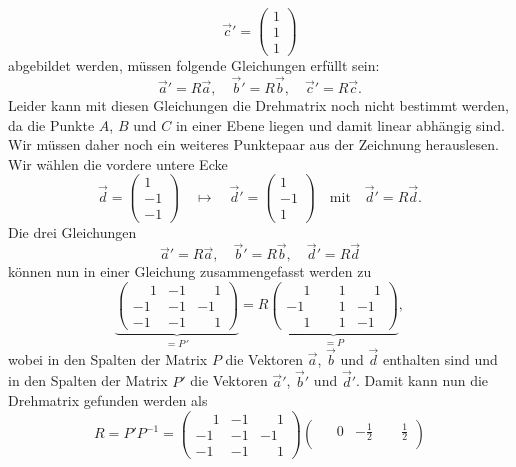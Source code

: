 \begin{loesung}
\begin{teilaufgaben}
\[  \vec c' = \begin{pmatrix}1\\1\\1\end{pmatrix}                          
\]
abgebildet werden, müssen folgende Gleichungen erfüllt sein:
\[
  \vec a' = R\vec a, \quad 
  \vec b' = R\vec b, \quad 
  \vec c' = R\vec c.
\]
Leider kann mit diesen Gleichungen die Drehmatrix noch nicht bestimmt werden, 
da die Punkte $A$, $B$ und $C$ in einer Ebene liegen und damit linear abhängig sind.
Wir müssen daher noch ein weiteres Punktepaar aus der Zeichnung herauslesen.
Wir wählen die vordere untere Ecke
\[
\vec d =\begin{pmatrix}1\\-1\\-1\end{pmatrix} \quad\mapsto\quad \vec d'=\begin{pmatrix}1\\-1\\1\end{pmatrix}
\quad\text{mit}\quad\vec d' = R\vec d.
\]
Die drei Gleichungen
\[
  \vec a' = R\vec a, \quad 
  \vec b' = R\vec b, \quad 
  \vec d' = R\vec d
\]
können nun in einer Gleichung zusammengefasst werden zu
\[
\underbrace{
\begin{pmatrix}
\phantom{-}1&-1&\phantom{-}1\\
         - 1&-1&         - 1\\
         - 1&-1&\phantom{-}1
\end{pmatrix}}_{\displaystyle =P\,'}
=
R
\underbrace{
\begin{pmatrix}
\phantom{-}1&\phantom{-}1&\phantom{-}1\\
         - 1&\phantom{-}1&         - 1\\
\phantom{-}1&\phantom{-}1&         - 1
\end{pmatrix}}_{\displaystyle =P},
\]
wobei in den Spalten der Matrix $P$ die Vektoren $\vec a$, $\vec b$ und $\vec d$ enthalten sind
und in den Spalten der Matrix $P'$ die Vektoren $\vec a'$, $\vec b'$ und $\vec d'$. 
Damit kann nun die Drehmatrix gefunden werden als
\[
R = P'P^{-1} = 
\begin{pmatrix}
\phantom{-}1&-1&\phantom{-}1\\
         - 1&-1&         - 1\\
         - 1&-1&\phantom{-}1
\end{pmatrix}
\begin{pmatrix}
\phantom{-}0&         - \frac12&\phantom{-}\frac12\\

\end{pmatrix}\]
\end{teilaufgaben}
\end{loesung}
